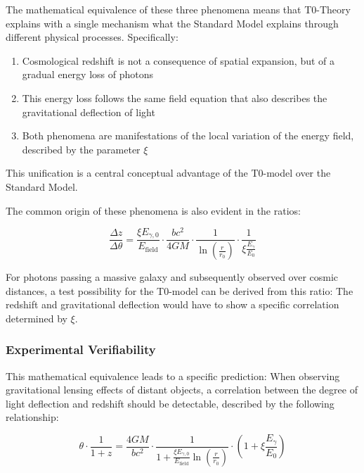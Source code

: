 \documentclass[12pt,a4paper]{article}
\theoremstyle{definition}
\begin{document}
	\begin{wichtig}
		The mathematical equivalence of these three phenomena means that T0-Theory explains with a single mechanism what the Standard Model explains through different physical processes. Specifically:
		
		\begin{enumerate}
			\item Cosmological redshift is not a consequence of spatial expansion, but of a gradual energy loss of photons
			\item This energy loss follows the same field equation that also describes the gravitational deflection of light
			\item Both phenomena are manifestations of the local variation of the energy field, described by the parameter $\xi$
		\end{enumerate}
		
		This unification is a central conceptual advantage of the T0-model over the Standard Model.
	\end{wichtig}
	
	\begin{verhaltnis}
		The common origin of these phenomena is also evident in the ratios:
		
		\begin{equation}
			\frac{\Delta z}{\Delta \theta} = \frac{\xi E_{\gamma,0}}{E_{\text{field}}} \cdot \frac{bc^2}{4GM} \cdot \frac{1}{\ln\left(\frac{r}{r_0}\right)} \cdot \frac{1}{\xi \frac{E_\gamma}{E_0}}
		\end{equation}
		
		For photons passing a massive galaxy and subsequently observed over cosmic distances, a test possibility for the T0-model can be derived from this ratio: The redshift and gravitational deflection would have to show a specific correlation determined by $\xi$.
	\end{verhaltnis}
	
	\subsubsection{Experimental Verifiability}
	
	This mathematical equivalence leads to a specific prediction: When observing gravitational lensing effects of distant objects, a correlation between the degree of light deflection and redshift should be detectable, described by the following relationship:
	
	\begin{equation}
		\theta \cdot \frac{1}{1+z} = \frac{4GM}{bc^2} \cdot \frac{1}{1 + \frac{\xi E_{\gamma,0}}{E_{\text{field}}} \ln\left(\frac{r}{r_0}\right)} \cdot \left(1 + \xi \frac{E_\gamma}{E_0}\right)
	\end{equation}
	
\end{document}
